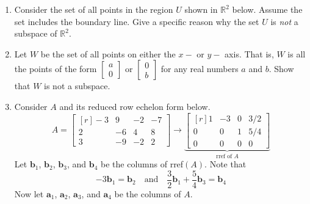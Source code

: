 \documentclass[basic]{inVerba-notes}
\newcommand{\R}{\mathbb{R}}
\begin{document}
\begin{enumerate}[align=left, leftmargin=0pt, labelindent=\parindent, listparindent=\parindent, labelwidth=0pt, itemindent=!]\color{minor}
  \item Consider the set of all points in the region \(U\) shown in \(\R^2\) below. Assume the set includes the boundary line. Give a specific reason why the set \(U\) is \textit{not} a subspace of \(\mathbb{R}^2\).
   
  \begin{center}
  \end{center}
  
  \item Let \(W\) be the set of all points on either the \(x-\) or \(y-\) axis. That is, \(W\) is all the points of the form \(\begin{bmatrix} a \\ 0 \end{bmatrix}\) or \(\begin{bmatrix} 0 \\ b \end{bmatrix}\) for any real numbers \(a\) and \(b\). Show that \(W\) is not a subspace.
  
  \item Consider \(A\) and its reduced row echelon form below.
  \[
  A=\begin{bmatrix*}[r] -3 & 9 & -2 & -7 \\
  2 & -6 & 4 & 8 \\
  3 & -9 & -2 & 2\end{bmatrix*}
  \rightarrow
  \underbrace{\begin{bmatrix*}[r]1 & -3 & 0 & 3/2\\
  0 & 0 & 1 & 5/4 \\
  0 & 0 & 0 & 0\end{bmatrix*}}_{\text{rref of }A}
  \]
  Let \(\bm{b}_1\), \(\bm{b}_2\), \(\bm{b}_3\), and \(\bm{b}_4\) be the columns of rref\((A)\). Note that 
  \[-3\bm{b}_1 = \bm{b}_2 \quad \text{and} \quad \frac{3}{2}\bm{b}_1 + \frac{5}{4}\bm{b}_3 = \bm{b}_4
  \]
  Now let \(\bm{a}_1\), \(\bm{a}_2\), \(\bm{a}_3\), and \(\bm{a}_4\) be the columns of \(A\).
  

\end{enumerate}
\end{document}
